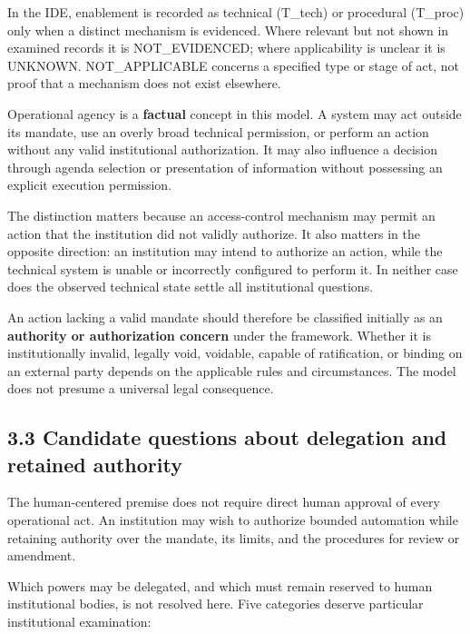 \documentclass[
  10pt,
]{article}
\begin{document}
In the IDE, enablement is recorded as technical (T\_tech) or procedural
(T\_proc) only when a distinct mechanism is evidenced. Where relevant
but not shown in examined records it is NOT\_EVIDENCED; where
applicability is unclear it is UNKNOWN. NOT\_APPLICABLE concerns a
specified type or stage of act, not proof that a mechanism does not
exist elsewhere.

Operational agency is a \textbf{factual} concept in this model. A system
may act outside its mandate, use an overly broad technical permission,
or perform an action without any valid institutional authorization. It
may also influence a decision through agenda selection or presentation
of information without possessing an explicit execution permission.

The distinction matters because an access-control mechanism may permit
an action that the institution did not validly authorize. It also
matters in the opposite direction: an institution may intend to
authorize an action, while the technical system is unable or incorrectly
configured to perform it. In neither case does the observed technical
state settle all institutional questions.

An action lacking a valid mandate should therefore be classified
initially as an \textbf{authority or authorization concern} under the
framework. Whether it is institutionally invalid, legally void,
voidable, capable of ratification, or binding on an external party
depends on the applicable rules and circumstances. The model does not
presume a universal legal consequence.

\subsection{3.3 Candidate questions about delegation and retained
authority}\label{candidate-questions-about-delegation-and-retained-authority}

The human-centered premise does not require direct human approval of
every operational act. An institution may wish to authorize bounded
automation while retaining authority over the mandate, its limits, and
the procedures for review or amendment.

Which powers may be delegated, and which must remain reserved to human
institutional bodies, is not resolved here. Five categories deserve
particular institutional examination:
\end{document}
